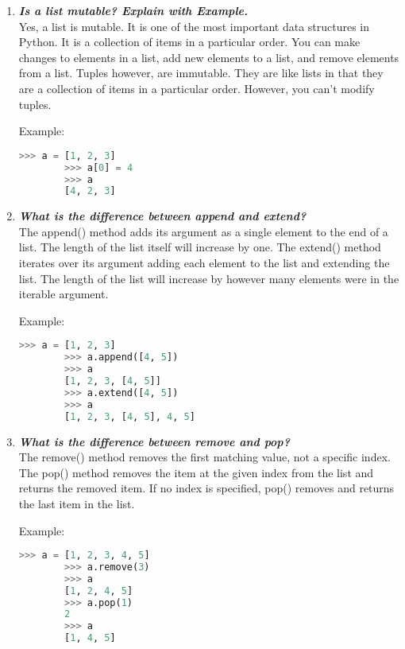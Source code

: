 \documentclass[11pt]{article}
\begin{document}
\begin{enumerate}
\item \textbf{\textit{Is a list mutable? Explain with Example.}}\\
		Yes, a list is mutable. It is one of the most important data structures in Python. It is a collection of items in a particular order. You can make changes to elements in a list, add new elements to a list, and remove elements from a list. Tuples however, are immutable. They are like lists in that they are a collection of items in a particular order. However, you can't modify tuples.


		Example: \\
		\begin{lstlisting}[language=Python]
		>>> a = [1, 2, 3]
		>>> a[0] = 4
		>>> a
		[4, 2, 3]
	\end{lstlisting}

\item \textbf{\textit{What is the difference between append and extend?}}\\
		The append() method adds its argument as a single element to the end of a list. The length of the list itself will increase by one. The extend() method iterates over its argument adding each element to the list and extending the list. The length of the list will increase by however many elements were in the iterable argument.

		Example: \\
		\begin{lstlisting}[language=Python]
		>>> a = [1, 2, 3]
		>>> a.append([4, 5])
		>>> a
		[1, 2, 3, [4, 5]]
		>>> a.extend([4, 5])
		>>> a
		[1, 2, 3, [4, 5], 4, 5]
	\end{lstlisting}
\item \textbf{\textit{What is the difference between remove and pop?}}\\
		The remove() method removes the first matching value, not a specific index. The pop() method removes the item at the given index from the list and returns the removed item. If no index is specified, pop() removes and returns the last item in the list.

		Example: \\
		\begin{lstlisting}[language=Python]
		>>> a = [1, 2, 3, 4, 5]
		>>> a.remove(3)
		>>> a
		[1, 2, 4, 5]
		>>> a.pop(1)
		2
		>>> a
		[1, 4, 5]
	\end{lstlisting}

\end{enumerate}
\end{document}
